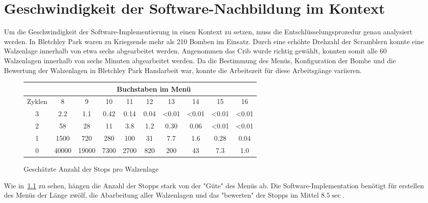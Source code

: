 \chapter{Geschwindigkeit der Software-Nachbildung im Kontext}\label{ch:speed}

Um die Geschwindigkeit der Software-Implementierung in einen Kontext zu setzen, muss die Entschlüsselungsprozedur genau analysiert werden.
In Bletchley Park waren zu Kriegsende mehr als 210 Bomben im Einsatz.
Durch eine erhöhte Drehzahl der Scramblern konnte eine Walzenlage innerhalb von etwa sechs abgearbeitet werden.
Angenommen das Crib wurde richtig gewählt, konnten somit alle 60 Walzenlagen innerhalb von sechs Minuten abgearbeitet werden.
Da die Bestimmung des Menüs, Konfiguration der Bombe und die Bewertung der Walzenlagen in Bletchley Park Handarbeit war, konnte die Arbeitszeit für diese Arbeitsgänge variieren.

\begin{figure}[htbp]
	\centering
	\caption{Geschätzte Anzahl der Stops pro Walzenlage~\autocite{enwiki:bombe}}
	\label{fig:num-stops}
	\begin{tabular}{|c|c|c|c|c|c|c|c|c|c|}
		\hline
		& \multicolumn{9}{c|}{Buchstaben im Menü} \\
		\hline
		Zyklen & 8 & 9 & 10 & 11 & 12 & 13 & 14 & 15 & 16 \\
		\hline
		3 & 2.2  & 1.1  & 0.42  & 0.14  & 0.04  & <0.01  & <0.01  & <0.01  & <0.01 \\
		\hline
		2 & 58  & 28  & 11  & 3.8  & 1.2  & 0.30  & 0.06  & <0.01  & <0.01  \\
		\hline
		1 & 1500  & 720  & 280  & 100  & 31  & 7.7  & 1.6  & 0.28  & 0.04  \\
		\hline
		0 & 40000  & 19000  & 7300  & 2700  & 820  & 200  & 43  & 7.3  & 1.0  \\
		\hline
	\end{tabular}
\end{figure}


Wie in~\cref{fig:num-stops} zu sehen, hängen die Anzahl der Stopps stark von der "Güte" des Menüs ab.
Die Software-Implementation benötigt für erstellen des Menüs der Länge zwölf, die Abarbeitung aller Walzenlagen und das "bewerten" der Stopps im Mittel 
$8.5\si{\sec}$.

\[
\]
